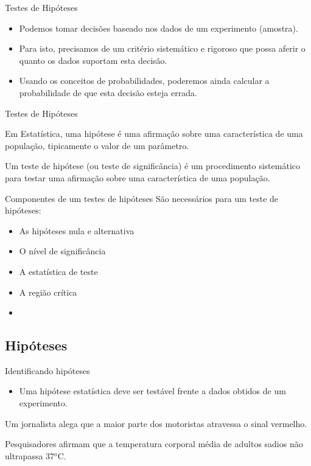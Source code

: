 \documentclass{beamer}
\begin{document}
\begin{frame}{Testes de Hipóteses}
  \begin{itemize}
  \item Podemos tomar decisões baseado nos dados de um experimento
    (amostra).
  \item Para isto, precisamos de um critério sistemático e rigoroso
    que possa aferir o quanto os dados suportam esta decisão.
  \item Usando os conceitos de probabilidades, poderemos ainda
    calcular a probabilidade de que esta decisão esteja errada.
  \end{itemize}
\end{frame}

\begin{frame}{Testes de Hipóteses}
  \begin{definition}
    Em Estatística, uma \alert{hipótese} é uma afirmação sobre uma
    característica de uma população, tipicamente o valor de um
    parâmetro.
  \end{definition}
  \begin{definition}
    Um \alert{teste de hipótese} (ou teste de significância) é um
    procedimento sistemático para testar uma afirmação sobre uma
    característica de uma população.
  \end{definition}
\end{frame}

\begin{frame}{Componentes de um testes de hipóteses}
  São necessários para um teste de hipóteses:
  \begin{itemize}
  \item As hipóteses nula e alternativa
  \item O nível de significância
  \item A estatística de teste
  \item A região crítica
  \item 
  \end{itemize}
\end{frame}

\subsection{Hipóteses}

\begin{frame}{Identificando hipóteses}
  \begin{itemize}
  \item Uma hipótese estatística deve ser testável frente a dados
    obtidos de um experimento.
  \end{itemize}
  \begin{example}
    Um jornalista alega que a maior parte dos motoristas atravessa o
    sinal vermelho.
  \end{example}
  \begin{example}
    Pesquisadores afirmam que a temperatura corporal média de adultos
    sadios não ultrapassa 37$^o$C.
  \end{example}
\end{frame}
\end{document}
